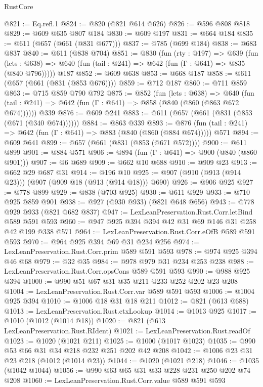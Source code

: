 \begin{lexlean}{RustCore}
\begin{coremodule}
@821 := Eq.refl.{1}
@824 := @820 (@821 @614 @626)
@826 := @596 @808 @818
@829 := @609 @635 @807 @184
@830 := @609 @197
@831 := @664 @184
@835 := @611 (@657 (@661 (@831 @677)))
@837 := @785 (@699 @184)
@838 := @683 @837
@840 := @611 (@838 @704)
@851 := @830
    (fun (rty : @197) =>
    @639
      (fun (lets : @638) => @640 (fun (tail : @241) => @642 (fun (Γ : @641) => @835 (@840 @796)))))
    @187
@852 := @609 @638
@853 := @668 @187
@858 := @611 (@657 (@661 (@831 (@853 @676))))
@859 := @712 @187
@860 := @711 @859
@863 := @715 @859 @790 @792
@875 := @852
    (fun (lets : @638) =>
    @640 (fun (tail : @241) => @642 (fun (Γ : @641) => @858 (@840 (@860 (@863 @672 @674))))))
    @339
@876 := @609 @241
@883 := @611 (@657 (@661 (@831 (@853 (@671 (@340 @674))))))
@884 := @863 @339
@893 := @876 (fun (tail : @241) => @642 (fun (Γ : @641) => @883 (@840 (@860 (@884 @674))))) @571
@894 := @609 @641
@899 := @657 (@661 (@831 (@853 (@671 @572))))
@900 := @611 @899
@901 := @884 @571
@906 := @894 (fun (Γ : @641) => @900 (@840 (@860 @901)))
@907 := @6 @689
@909 := @662 @10 @688
@910 := @909 @23
@913 := @662 @29 @687 @31
@914 := @196 @10
@925 := @907 (@910 (@913 (@914 @23))) (@907 (@909 @18 (@913 (@914 @18))) @690)
@926 := @906 @925
@927 := @778 @899
@929 := @838 (@703 @925)
@930 := @611 @929
@933 := @710 @925 @859 @901
@938 := @927 (@930 @933) (@821 @648 @656)
@943 := @778 @929 @933 (@821 @682 @837)
@947 := LexLeanPreservation.Rust.Corr.letBind @589 @591 @593
@960 := @947 @925 @394 @394 @42 @31 @69 @146 @31 @258 @42 @199 @338 @571
@964 := LexLeanPreservation.Rust.Corr.eOfB @589 @591 @593
@970 := @964 @925 @394 @69 @31 @234 @256
@974 := LexLeanPreservation.Rust.Corr.prim @589 @591 @593
@978 := @974 @925 @394 @46 @68
@979 := @32 @35
@984 := @978 @979 @31 @234 @253 @238
@988 := LexLeanPreservation.Rust.Corr.opsCons @589 @591 @593
@990 := @988 @925 @394
@1000 := @990 @51 @67 @31 @35 @211 @233 @252 @202 @23 @208
@1004 := LexLeanPreservation.Rust.Corr.var @589 @591 @593
@1006 := @1004 @925 @394
@1010 := @1006 @18 @31 @18 @211
@1012 := @821 (@613 @688)
@1013 := LexLeanPreservation.Rust.ctxLookup
@1014 := @1013 @925
@1017 := @1010 (@1012 (@1014 @18))
@1020 := @821 (@613 LexLeanPreservation.Rust.RIdent)
@1021 := LexLeanPreservation.Rust.readOf
@1023 := @1020 (@1021 @211)
@1025 := @1000 (@1017 @1023)
@1035 := @990 @53 @66 @31 @34 @218 @232 @251 @202 @42 @208
@1042 := @1006 @23 @31 @23 @218 (@1012 (@1014 @23))
@1044 := @1020 (@1021 @218)
@1046 := @1035 (@1042 @1044)
@1056 := @990 @63 @65 @31 @33 @228 @231 @250 @202 @74 @208
@1060 := LexLeanPreservation.Rust.Corr.value @589 @591 @593

\end{coremodule}
\end{lexlean}
